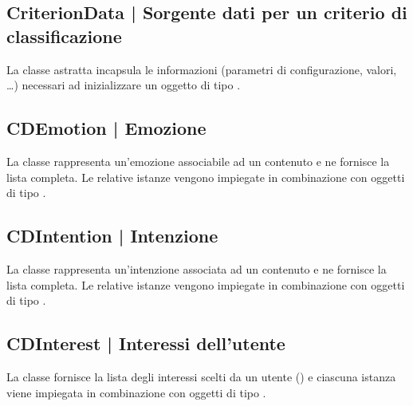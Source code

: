 \documentclass[10pt,a4paper,headinclude,footinclude,hidelinks]{scrreprt} %
\begin{document}
	\subsection[CriterionData]{CriterionData | Sorgente dati per un criterio di classificazione}
	\label{sec:stage:design:sistema:model.criteria:criterion-data}
	La classe astratta \textit{} incapsula le informazioni (parametri di configurazione, valori, \ldots) necessari ad inizializzare un oggetto di tipo \textit{}.

	\subsection[CDEmotion]{CDEmotion | Emozione}
	\label{sec:stage:design:sistema:model.criteria:emotion}
	La classe rappresenta un'emozione associabile ad un contenuto e ne fornisce la lista completa. Le relative istanze vengono impiegate in combinazione con oggetti di tipo \textit{}.

	\subsection[CDIntention]{CDIntention | Intenzione}
	\label{sec:stage:design:sistema:model.criteria:intention}
	La classe rappresenta un'intenzione associata ad un contenuto e ne fornisce la lista completa. Le relative istanze vengono impiegate in combinazione con oggetti di tipo \textit{}.

	\subsection[CDInterest]{CDInterest | Interessi dell'utente}
	\label{sec:stage:design:sistema:model.criteria:interest}
	La classe fornisce la lista degli interessi scelti da un utente (\textit{}) e ciascuna istanza viene impiegata in combinazione con oggetti di tipo \textit{}.
\end{document}
